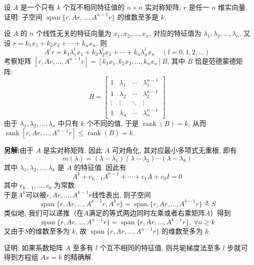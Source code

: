 \documentclass[12pt, answers]{exam}     %
\newcommand{\anothersolution}{\par\noindent\textbf{另解:}}
\begin{document}
\begin{questions}
\question{}设 \( A \) 是一个只有 \( k \) 个互不相同特征值的 \( n \times n \) 实对称矩阵, \( r \) 是任一 \( n \) 维实向量. 证明: 子空间 \( \operatorname{span}\{r, Ar, \ldots, A^{n-1}r\} \) 的维数至多是 \( k \). 

\begin{solution}
设 \( A \) 的 \( n \) 个线性无关的特征向量为 \( x_1, x_2, \ldots, x_n \), 对应的特征值为 \( \lambda_1, \lambda_2, \ldots, \lambda_n \). 又设 \( r = k_1x_1 + k_2x_2 + \cdots + k_nx_n \). 则
\[
A^l r = k_1 \lambda_1^l x_1 + k_2 \lambda_2^l x_2 + \cdots + k_n \lambda_n^l x_n \quad (l = 0, 1, 2, \ldots)
\]
考察矩阵 \([r, Ar, \ldots, A^{n-1}r] = [k_1x_1, k_2x_2, \ldots, k_nx_n] B\), 其中 \( B \) 恰是范德蒙德矩阵: 
\[
B = \begin{bmatrix} 
1 & \lambda_1 & \cdots & \lambda_1^{n-1} \\ 
1 & \lambda_2 & \cdots & \lambda_2^{n-1} \\ 
\vdots & \vdots & \ddots & \vdots \\ 
1 & \lambda_n & \cdots & \lambda_n^{n-1} 
\end{bmatrix}
\]
由于 \( \lambda_1, \lambda_2, \ldots, \lambda_n \) 中只有 \( k \) 个不同的值, 于是 \( \operatorname{rank}(B) = k \), 从而 \( \operatorname{rank}[r, Ar, \ldots, A^{n-1}r] \leq \operatorname{rank}(B) = k \). 

\anothersolution{}由于 \( A \) 是实对称矩阵, 因此 \( A \) 可对角化, 其对应最小多项式无重根, 即有
\[
m(\lambda) = (\lambda - \lambda_1)(\lambda - \lambda_2) \cdots (\lambda - \lambda_k)
\]
其中 \( \lambda_1, \lambda_2, \ldots, \lambda_k \) 是 \( A \) 的特征值. 因此有
\[
A^k + c_{k-1} A^{k-1} + \cdots + c_1 A + c_0 I = 0
\]
其中 \( c_{k-1}, \ldots, c_0 \) 为常数. \\
于是\( A^k \)可以被\(r, Ar, \ldots, A^{k-1}r\)线性表出, 则子空间 \[ \operatorname{span}\{r, Ar, \ldots, A^{k - 1}r, A^{k}r\} = \operatorname{span}\{r, Ar, \ldots, A^{k - 1}r\} \triangleq S \]
类似地, 我们可以递推（在$A$满足的等式两边同时左乘或者右乘矩阵\(A\)）得到 \[ \operatorname{span}\{r, Ar, \ldots, A^{n-1}r\} = \operatorname{span}\{r, Ar, \ldots, A^{k - 1}r\},\: \forall n \geq k \]
又由于\( S \)的维数至多为 \( k \), 
故 \( \operatorname{span}\{r, Ar, \ldots, A^{n-1}r\} \) 的维数至多为 \( k \). 

\end{solution}

\question{}证明: 如果系数矩阵 \( A \) 至多有 \( l \) 个互不相同的特征值, 则共轭梯度法至多 \( l \) 步就可得到方程组 \( Ax = b \) 的精确解. 


\end{questions}
\end{document}

